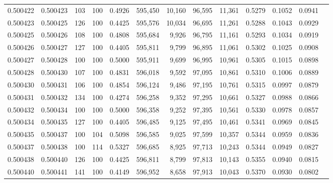 \begin{tabular}{rrrrrrrrrrrrr}
0.500422 & 0.500423 &   103 & 100 &                                     0.4926 & 595,450 &  10,160 &  96,595 &  11,361 & 0.5279 & 0.1052 & 0.0941 \\
0.500423 & 0.500425 &   126 & 100 &                                     0.4425 & 595,576 &  10,034 &  96,695 &  11,261 & 0.5288 & 0.1043 & 0.0929 \\
0.500425 & 0.500426 &   108 & 100 &                                     0.4808 & 595,684 &   9,926 &  96,795 &  11,161 & 0.5293 & 0.1034 & 0.0919 \\
0.500426 & 0.500427 &   127 & 100 &                                     0.4405 & 595,811 &   9,799 &  96,895 &  11,061 & 0.5302 & 0.1025 & 0.0908 \\
0.500427 & 0.500428 &   100 & 100 &                                     0.5000 & 595,911 &   9,699 &  96,995 &  10,961 & 0.5305 & 0.1015 & 0.0898 \\
0.500428 & 0.500430 &   107 & 100 &                                     0.4831 & 596,018 &   9,592 &  97,095 &  10,861 & 0.5310 & 0.1006 & 0.0889 \\
0.500430 & 0.500431 &   106 & 100 &                                     0.4854 & 596,124 &   9,486 &  97,195 &  10,761 & 0.5315 & 0.0997 & 0.0879 \\
0.500431 & 0.500432 &   134 & 100 &                                     0.4274 & 596,258 &   9,352 &  97,295 &  10,661 & 0.5327 & 0.0988 & 0.0866 \\
0.500432 & 0.500434 &   100 & 100 &                                     0.5000 & 596,358 &   9,252 &  97,395 &  10,561 & 0.5330 & 0.0978 & 0.0857 \\
0.500434 & 0.500435 &   127 & 100 &                                     0.4405 & 596,485 &   9,125 &  97,495 &  10,461 & 0.5341 & 0.0969 & 0.0845 \\
0.500435 & 0.500437 &   100 & 104 &                                     0.5098 & 596,585 &   9,025 &  97,599 &  10,357 & 0.5344 & 0.0959 & 0.0836 \\
0.500437 & 0.500438 &   100 & 114 &                                     0.5327 & 596,685 &   8,925 &  97,713 &  10,243 & 0.5344 & 0.0949 & 0.0827 \\
0.500438 & 0.500440 &   126 & 100 &                                     0.4425 & 596,811 &   8,799 &  97,813 &  10,143 & 0.5355 & 0.0940 & 0.0815 \\
0.500440 & 0.500441 &   141 & 100 &                                     0.4149 & 596,952 &   8,658 &  97,913 &  10,043 & 0.5370 & 0.0930 & 0.0802 \\

\end{tabular}
